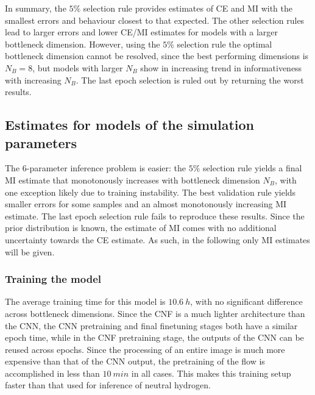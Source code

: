 In summary, the $5\%$ selection rule provides estimates of CE and MI with the smallest errors and behaviour closest to that expected. The other selection rules lead to larger errors and lower CE/MI estimates for models with a larger bottleneck dimension. However, using the $5\%$ selection rule the optimal bottleneck dimension cannot be resolved, since the best performing dimensions is $N_B=8$, but models with larger $N_B$ show in increasing trend in informativeness with increasing $N_B$. The last epoch selection is ruled out by returning the worst results.

\subsection{Estimates for models of the simulation parameters}
The 6-parameter inference problem is easier: the $5\%$ selection rule yields a final MI estimate that monotonously increases with bottleneck dimension $N_B$, with one exception likely due to training instability. The best validation rule yields smaller errors for some samples and an almost monotonously increasing MI estimate. The last epoch selection rule fails to reproduce these results. Since the prior distribution is known, the estimate of MI comes with no additional uncertainty towards the CE estimate. As such, in the following only MI estimates will be given.

\subsubsection*{Training the model}
The average training time for this model is $10.6~\si{h}$, with no significant difference across bottleneck dimensions. Since the CNF is a much lighter architecture than the CNN, the CNN pretraining and final finetuning stages both have a similar epoch time, while in the CNF pretraining stage, the outputs of the CNN can be reused across epochs. Since the processing of an entire image is much more expensive than that of the CNN output, the pretraining of the flow is accomplished in less than $10~\si{min}$ in all cases. This makes this training setup faster than that used for inference of neutral hydrogen.

